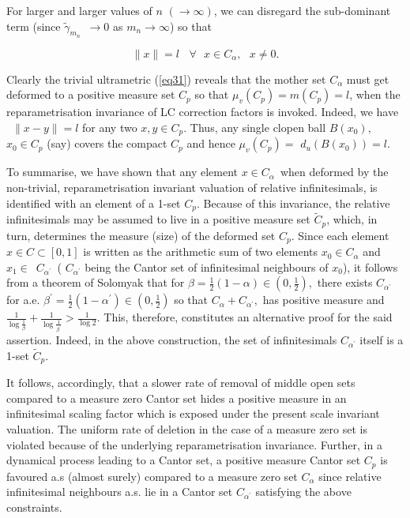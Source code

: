 \documentclass[12pt]{article}
\begin{document}
\noindent For larger and larger values of $n$ $(\rightarrow \infty )$, we can disregard
the sub-dominant term (since $\tilde{\gamma}_{m_{n}}$\ $\rightarrow 0$ as $%
m_n \rightarrow \infty $) so that 

\begin{equation}\label{eq31}
\parallel x\parallel =l \ \text{ }\forall \text{ }x\in C_{\alpha },\text{ }%
x\neq 0.
\end{equation}

\noindent Clearly the trivial ultrametric (\ref{eq31}) reveals that the mother set $C_{\alpha} $ must get  deformed to a positive measure set $C_p$ so that $\mu _{v}(C_p)=m(C_p)=l$, 
when the reparametrisation invariance of LC correction factors is invoked. 
Indeed, we have \ $\parallel x-y\parallel =l$ for any two $x,y\in C_p.$ Thus,
any single clopen ball $B\left( x_{0}\right) ,$ $x_{0}\in C_p$ (say) covers
the compact $C_p$ and hence $\mu _{v}(C_p)=$ $d_{u}\left( B\left( x_{0}\right)
\right) =l.$  

\vspace{.25cm}

To summarise, we have shown that any element $x\in C_{\alpha }$\ when
deformed by the non-trivial, reparametrisation invariant valuation of
relative infinitesimals, is identified with an element of a 1-set $C_p$. Because of this invariance, the relative infinitesimals may be assumed to live in a positive measure set $\tilde C_p$, which, in turn, determines the measure (size) of the deformed set $C_p$. Since
each element $x\in C\subset [0,1]$ is written as the arithmetic sum of two elements $
x_{0}\in C_{\alpha }$ and $x_{1}\in $\ $C_{\alpha ^{\prime }}$\ ( $C_{\alpha
^{\prime }}$ being the Cantor set of infinitesimal neighbours of $x_{0}$), it
follows from a theorem of Solomyak \cite{solo} that for $\beta =\frac{1}{2}\left(
1-\alpha \right) \in \left( 0,\frac{1}{2}\right) ,$ there exists $C_{\alpha
^{\prime }}$ for a.e. $\beta ^{\prime }=\frac{1}{2}\left( 1-\alpha ^{\prime
}\right) \in \left( 0,\frac{1}{2}\right) $ so that $C_{\alpha }+C_{\alpha
^{\prime }},$ has positive measure and $\frac{1}{\log \frac{1}{\beta }}+%
\frac{1}{\log \frac{1}{\beta ^{\prime }}}>\frac{1}{\log 2}.$ This, therefore, constitutes an alternative proof for the said assertion. Indeed, in the above construction, the set of infinitesimals $C_{\alpha^{\prime}}$ itself is a 1-set $\tilde C_{p}$.

\vspace{.25cm}

It follows, accordingly, that a slower rate of removal of middle open sets 
compared to a measure zero Cantor set hides a positive measure in an 
infinitesimal scaling factor which is exposed under the present scale invariant 
valuation. The uniform rate of deletion in the case of a measure zero set 
is  violated because of the underlying reparametrisation invariance. Further, in a 
dynamical process leading to  a Cantor set, a positive measure Cantor set $C_p$
is favoured a.s (almost surely) compared to a measure zero set $C_{\alpha}$ since 
relative infinitesimal neighbours a.s. lie in a Cantor set $C_{\alpha^{\prime}}$ 
satisfying the above constraints.
\end{document}
